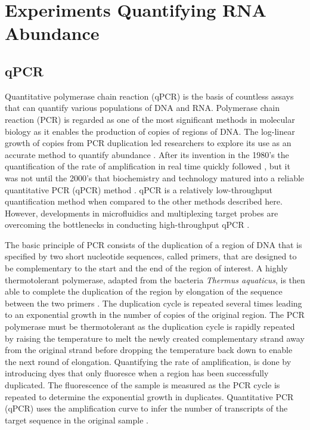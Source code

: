 \documentclass[../main.tex]{subfiles}
\begin{document}
\newpage


\section{Experiments Quantifying RNA Abundance}

\subsection{qPCR}

Quantitative polymerase chain reaction (qPCR) is the basis of countless assays that can quantify various populations of DNA and RNA.
Polymerase chain reaction (PCR) is regarded as one of the most significant methods in molecular biology as it enables the production of copies of regions of DNA. 
The log-linear growth of copies from PCR duplication led researchers to explore its use as an accurate method to quantify abundance \parencite{Saiki1988}.
After its invention in the 1980's the quantification of the rate of amplification in real time quickly followed \parencite{Holland1991}, but it was not until the 2000's that biochemistry and technology matured into a reliable quantitative PCR (qPCR) method \parencite{Walker2002}.
qPCR is a relatively low-throughput quantification method when compared to the other methods described here.
However, developments in microfluidics and multiplexing target probes are overcoming the bottlenecks in conducting high-throughput qPCR \parencite{Dreier2022}.

The basic principle of PCR consists of the duplication of a region of DNA that is specified by two short nucleotide sequences, called primers, that are designed to be complementary to the start and the end of the region of interest. 
A highly thermotolerant polymerase, adapted from the bacteria \textit{Thermus aquaticus}, is then able to complete the duplication of the region by elongation of the sequence between the two primers \parencite{Saiki1988}.
The duplication cycle is repeated several times leading to an exponential growth in the number of copies of the original region.
The PCR polymerase must be thermotolerant as the duplication cycle is rapidly repeated by raising the temperature to melt the newly created complementary strand away from the original strand before dropping the temperature back down to enable the next round of elongation. 
Quantifying the rate of amplification, is done by introducing dyes that only fluoresce when a region has been successfully duplicated. 
The fluorescence of the sample is measured as the PCR cycle is repeated to determine the exponential growth in duplicates.
Quantitative PCR (qPCR) uses the amplification curve to infer the number of transcripts of the target sequence in the original sample \parencite{Holland1991}.
\end{document}
